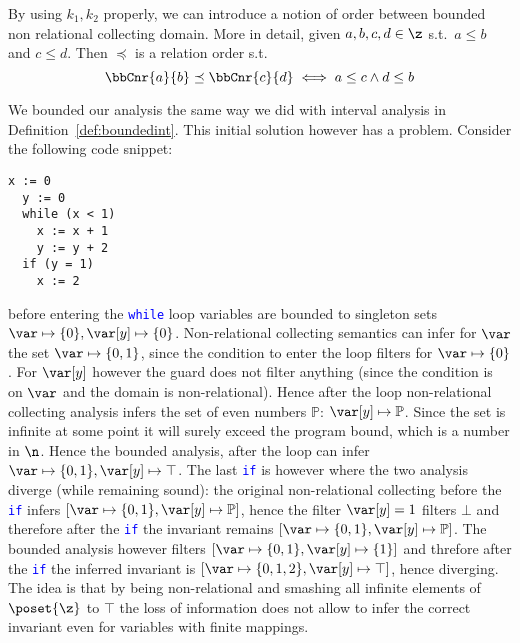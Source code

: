 By using \(k_1, k_2\) properly, we can introduce a notion of order
between bounded non relational collecting domain. More in detail,
given \(a,b,c,d \in \z\) s.t.\ \(a\leq b\) and \(c \leq d\). Then
\(\preceq\) is a relation order s.t.
\begin{equation*}
  \bbCnr{a}{b} \preceq \bbCnr{c}{d} \iff a \leq c \land d \leq b
\end{equation*}

We bounded our analysis the same way we did with interval analysis in
Definition~\ref{def:boundedint}. This initial solution however has a
problem. Consider the following code snippet:
\begin{lstlisting}[language=Imp,caption=Snippet where bounded analysis diverges from the unbounded counterpart, label=code3]
  x := 0
  y := 0
  while (x < 1)
    x := x + 1
    y := y + 2
  if (y = 1)
    x := 2
\end{lstlisting}
before entering the \textcolor{blue}{\texttt{while}} loop variables
are bounded to singleton sets
\(\var \mapsto \{0\}, \var[y] \mapsto \{0\}\). Non-relational
collecting semantics can infer for \(\var\) the set
\(\var\mapsto \{0,1\}\), since the condition to enter the loop filters
for \(\var \mapsto \{0\}\). For \(\var[y]\) however the guard does not
filter anything (since the condition is on \(\var\) and the domain is
non-relational). Hence after the loop non-relational collecting
analysis infers the set of even numbers \(\mathbb{P}\):
\(\var[y] \mapsto \mathbb{P}\). Since the set is infinite at some
point it will surely exceed the program bound, which is a number in
\(\n\). Hence the bounded analysis, after the loop can infer
\(\var\mapsto\{0,1\}, \var[y] \mapsto \top\). The last
\textcolor{blue}{\texttt{if}} is however where the two analysis
diverge (while remaining sound): the original non-relational
collecting before the \textcolor{blue}{\texttt{if}} infers
\([\var\mapsto\{0,1\}, \var[y]\mapsto\mathbb{P}]\), hence the filter
\(\var[y] = 1\) filters \(\bot\) and therefore after the
\textcolor{blue}{\texttt{if}} the invariant remains
\([\var\mapsto\{0,1\}, \var[y]\mapsto\mathbb{P}]\). The bounded
analysis however filters \([\var\mapsto\{0,1\}, \var[y]\mapsto\{1\}]\)
and threfore after the \textcolor{blue}{\texttt{if}} the inferred
invariant is \([\var\mapsto\{0,1,2\}, \var[y]\mapsto\top]\), hence
diverging. The idea is that by being non-relational and smashing all
infinite elements of \(\poset{\z}\) to \(\top\) the loss of
information does not allow to infer the correct invariant even for
variables with finite mappings.

